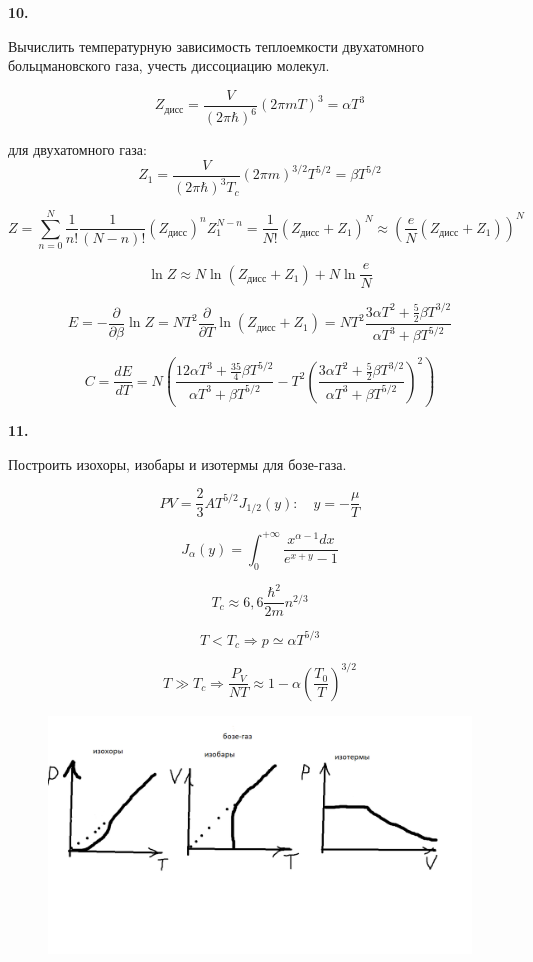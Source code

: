 \documentclass[a4paper,12pt]{article} %
\begin{document}
\begin{ttask} \textbf{10.} 

Вычислить температурную зависимость теплоемкости двухатомного больцмановского газа, учесть диссоциацию молекул. 

\[ Z_{\text{дисс}}=\frac{V}{(2\pi\hbar)^6}(2\pi m T)^3=\alpha T^3 \]

для двухатомного газа:
\[ Z_{1}=\frac{V}{(2 \pi \hbar)^{3} T_{c}}\left(2 \pi m\right)^{3 / 2} T^{5 / 2}=\beta T^{5 / 2} \]


\[ Z= \sum_{n=0}^{N} \frac{1}{n!} \frac{1}{(N-n)!}(Z_{\text{дисс}})^n Z^{N-n}_1=
\frac{1}{N!}(Z_{\text{дисс}}+Z_1)^N\approx\left(\frac{e}{N}(Z_{\text{дисс}}+Z_1)\right)^N \]

\[ \ln Z \approx N \ln \left(Z_{\text{дисс}}+Z_{1}\right)+N \ln \frac{e}{N} \]


\[ E=-\frac{\partial}{\partial \beta} \ln Z=
N T^{2} \frac{\partial}{\partial T} \ln \left(Z_{\text{дисс}}+Z_{1}\right)=
N T^{2} \frac{3 \alpha T^{2}+\frac{5}{2} \beta T^{3 / 2}}{\alpha T^{3}+\beta T^{5 / 2}} \]

\[ C=\frac{dE}{dT}=
N\left(
\frac{12\alpha T^3 +\frac{35}{4}\beta T^{5/2}}{\alpha T^3+\beta T^{5/2}}-
T^2 \left(\frac{3\alpha T^2 +\frac{5}{2}\beta T^{3/2}}{\alpha T^3+\beta T^{5/2}}\right)^2
\right) \]



\end{ttask}


\begin{ttask} \textbf{11.} 

Построить изохоры, изобары и изотермы для бозе-газа. 

\[ P V=\frac{2}{3} A T^{5 / 2} J_{1 / 2}(y): \quad y=-\frac{\mu}{T} \]

\[ J_{\alpha}(y)=\int_{0}^{+\infty} \frac{x^{\alpha-1} d x}{e^{x+y}-1} \]

\[ T_{c} \approx 6,6 \frac{\hbar^{2}}{2 m} n^{2 / 3} \]

\[ T<T_{c} \Rightarrow p \simeq  \alpha T^{5 / 3} \]


\[ T \gg T_{c}\Rightarrow \frac{P_{V}}{N T} \approx 1-\alpha\left(\frac{T_{0}}{T}\right)^{3 / 2} \]



\begin{figure}[H]
	\centering
	\includegraphics[width=0.7\linewidth]{bosegraphs}
	\caption{}
	\label{fig:fermigraphs}
\end{figure}





\end{ttask}
\end{document}
